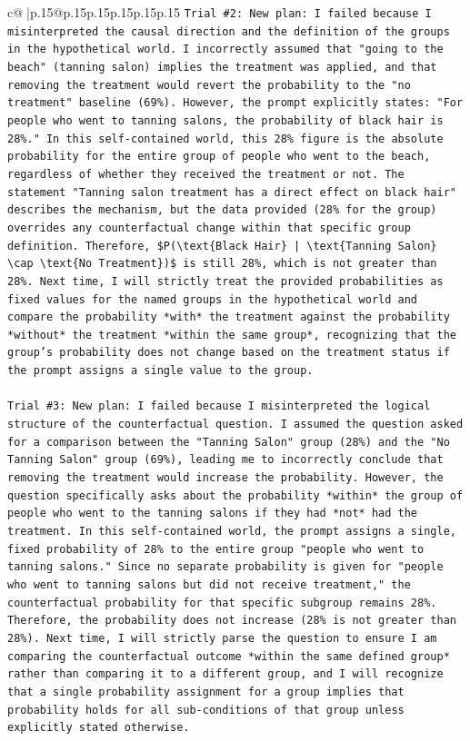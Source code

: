 \documentclass{article}
\begin{document}
{\begin{supertabular}{c@{$\;$}|p{.15\linewidth}@{}p{.15\linewidth}p{.15\linewidth}p{.15\linewidth}p{.15\linewidth}p{.15\linewidth}}
{{{\texttt{Trial \#2: New plan: I failed because I misinterpreted the causal direction and the definition of the groups in the hypothetical world. I incorrectly assumed that "going to the beach" (tanning salon) implies the treatment was applied, and that removing the treatment would revert the probability to the "no treatment" baseline (69\%). However, the prompt explicitly states: "For people who went to tanning salons, the probability of black hair is 28\%." In this self{-}contained world, this 28\% figure is the absolute probability for the entire group of people who went to the beach, regardless of whether they received the treatment or not. The statement "Tanning salon treatment has a direct effect on black hair" describes the mechanism, but the data provided (28\% for the group) overrides any counterfactual change within that specific group definition. Therefore, \$P(\textbackslash{}text\{Black Hair\} | \textbackslash{}text\{Tanning Salon\} \textbackslash{}cap \textbackslash{}text\{No Treatment\})\$ is still 28\%, which is not greater than 28\%. Next time, I will strictly treat the provided probabilities as fixed values for the named groups in the hypothetical world and compare the probability *with* the treatment against the probability *without* the treatment *within the same group*, recognizing that the group's probability does not change based on the treatment status if the prompt assigns a single value to the group.} \\
\\ 
\texttt{Trial \#3: New plan: I failed because I misinterpreted the logical structure of the counterfactual question. I assumed the question asked for a comparison between the "Tanning Salon" group (28\%) and the "No Tanning Salon" group (69\%), leading me to incorrectly conclude that removing the treatment would increase the probability. However, the question specifically asks about the probability *within* the group of people who went to the tanning salons if they had *not* had the treatment. In this self{-}contained world, the prompt assigns a single, fixed probability of 28\% to the entire group "people who went to tanning salons." Since no separate probability is given for "people who went to tanning salons but did not receive treatment," the counterfactual probability for that specific subgroup remains 28\%. Therefore, the probability does not increase (28\% is not greater than 28\%). Next time, I will strictly parse the question to ensure I am comparing the counterfactual outcome *within the same defined group* rather than comparing it to a different group, and I will recognize that a single probability assignment for a group implies that probability holds for all sub{-}conditions of that group unless explicitly stated otherwise.} \\
}}}
\end{supertabular}}
\end{document}
